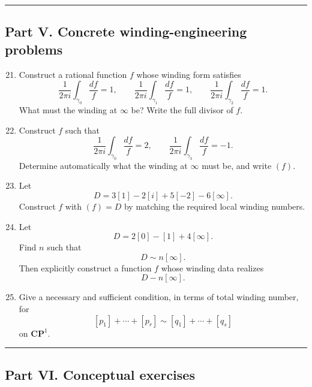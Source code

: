 \documentclass[11pt]{article}
\begin{document}
	\bigskip
	\hrule
	\bigskip
	
	\subsection*{Part V. Concrete winding-engineering problems}
	
	\begin{enumerate}
		\setcounter{enumi}{20}
		
		\item Construct a rational function \(f\) whose winding form satisfies
		\[
		\frac{1}{2\pi i}\int_{\gamma_0}\frac{df}{f}=1,\qquad
		\frac{1}{2\pi i}\int_{\gamma_1}\frac{df}{f}=1,\qquad
		\frac{1}{2\pi i}\int_{\gamma_2}\frac{df}{f}=1.
		\]
		What must the winding at \(\infty\) be? Write the full divisor of \(f\).
		
		\item Construct \(f\) such that
		\[
		\frac{1}{2\pi i}\int_{\gamma_0}\frac{df}{f}=2,\qquad
		\frac{1}{2\pi i}\int_{\gamma_3}\frac{df}{f}=-1.
		\]
		Determine automatically what the winding at \(\infty\) must be, and write \((f)\).
		
		\item Let
		\[
		D=3[1]-2[i]+5[-2]-6[\infty].
		\]
		Construct \(f\) with \((f)=D\) by matching the required local winding numbers.
		
		\item Let
		\[
		D=2[0]-[1]+4[\infty].
		\]
		Find \(n\) such that
		\[
		D\sim n[\infty].
		\]
		Then explicitly construct a function \(f\) whose winding data realizes
		\[
		D-n[\infty].
		\]
		
		\item Give a necessary and sufficient condition, in terms of total winding number, for
		\[
		[p_1]+\cdots+[p_r]\sim [q_1]+\cdots+[q_s]
		\]
		on \(\mathbf{CP}^1\).
	\end{enumerate}
	
	\bigskip
	\hrule
	\bigskip
	
	\subsection*{Part VI. Conceptual exercises}
	
\end{document}
